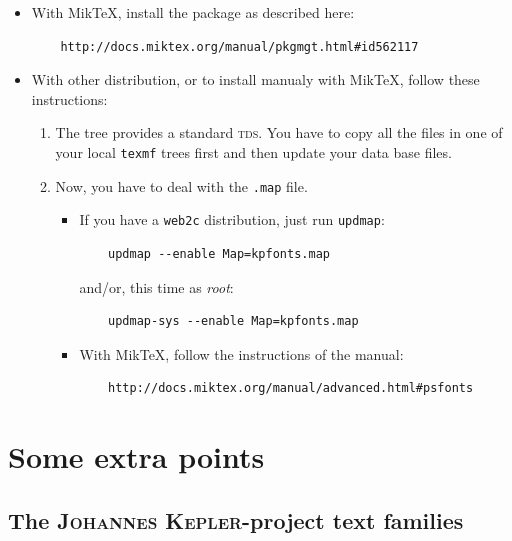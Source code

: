 \documentclass[a4paper,11pt]{article}
\begin{document}
\begin{itemize}
	\item 
	
With MikTeX, install the package as described here:

	\begin{verbatim}
	http://docs.miktex.org/manual/pkgmgt.html#id562117
	\end{verbatim}
	
	\item
	
With other distribution, or to install manualy with MikTeX, follow these instructions:

\begin{enumerate}
	\item 
The tree provides a standard \textsc{tds}. You have to copy all the files in one of your local \texttt{texmf} trees first and then update your data base files.
	\item
Now, you have to deal with the \texttt{.map} file.
\begin{itemize}
	\item 
If you have a \texttt{web2c} distribution, just run \texttt{updmap}:

	\begin{verbatim}
	updmap --enable Map=kpfonts.map
	\end{verbatim}
	
and/or, this time as \textit{root}:

	\begin{verbatim}
	updmap-sys --enable Map=kpfonts.map
	\end{verbatim}
	
	\item
With MikTeX, follow the instructions of the manual:

	\begin{verbatim}
	http://docs.miktex.org/manual/advanced.html#psfonts
	\end{verbatim}
	
\end{itemize}
	
\end{enumerate}
	
\end{itemize}

\section{Some extra points}

\subsection{The \textsc{Johannes Kepler}-project text families}
\end{document}
